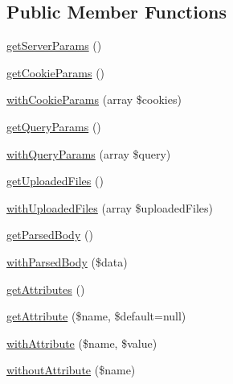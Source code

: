 \subsection*{Public Member Functions}
\begin{DoxyCompactItemize}
\item 
\hyperlink{interfacePsr_1_1Http_1_1Message_1_1ServerRequestInterface_a92fa019aa4ebe9839cf931708548879f}{get\+Server\+Params} ()
\item 
\hyperlink{interfacePsr_1_1Http_1_1Message_1_1ServerRequestInterface_ab9ba930a8a2d62d54213dc07334fc379}{get\+Cookie\+Params} ()
\item 
\hyperlink{interfacePsr_1_1Http_1_1Message_1_1ServerRequestInterface_a5f7d52160bd70abcc43f5b3940dd14eb}{with\+Cookie\+Params} (array \$cookies)
\item 
\hyperlink{interfacePsr_1_1Http_1_1Message_1_1ServerRequestInterface_af4fa67cf103fab09a968c650abea76f2}{get\+Query\+Params} ()
\item 
\hyperlink{interfacePsr_1_1Http_1_1Message_1_1ServerRequestInterface_aa291bcf612e3f975b929eeb6a23afbf6}{with\+Query\+Params} (array \$query)
\item 
\hyperlink{interfacePsr_1_1Http_1_1Message_1_1ServerRequestInterface_ae89e3ec7f266c270ff9e7572c6d4a23f}{get\+Uploaded\+Files} ()
\item 
\hyperlink{interfacePsr_1_1Http_1_1Message_1_1ServerRequestInterface_aeab9588f1afa2cdccd04671260ecaec8}{with\+Uploaded\+Files} (array \$uploaded\+Files)
\item 
\hyperlink{interfacePsr_1_1Http_1_1Message_1_1ServerRequestInterface_adea56ff4819890170ede9220c25cfbb1}{get\+Parsed\+Body} ()
\item 
\hyperlink{interfacePsr_1_1Http_1_1Message_1_1ServerRequestInterface_ac8dbe5e28829d7cb0d5b753eb5df8bc9}{with\+Parsed\+Body} (\$data)
\item 
\hyperlink{interfacePsr_1_1Http_1_1Message_1_1ServerRequestInterface_a0cda25a9b297c86e7813ffcb98ceb3df}{get\+Attributes} ()
\item 
\hyperlink{interfacePsr_1_1Http_1_1Message_1_1ServerRequestInterface_aa9af3e178ff942e43e9ce6ee82bbaaad}{get\+Attribute} (\$name, \$default=null)
\item 
\hyperlink{interfacePsr_1_1Http_1_1Message_1_1ServerRequestInterface_a1c7b69d585708476be91642b752d5478}{with\+Attribute} (\$name, \$value)
\item 
\hyperlink{interfacePsr_1_1Http_1_1Message_1_1ServerRequestInterface_a549f6aa6f534896b84b090ae10db23f6}{without\+Attribute} (\$name)
\end{DoxyCompactItemize}



